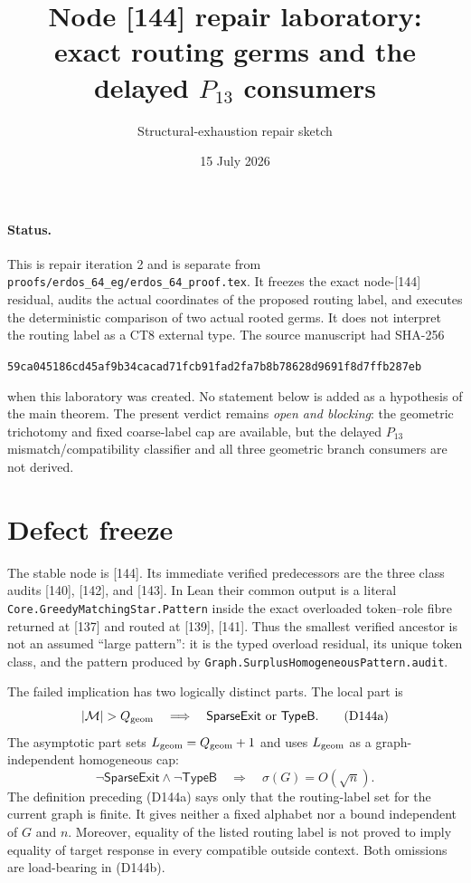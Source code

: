 \documentclass[11pt]{article}
\title{Node [144] repair laboratory:\\
exact routing germs and the delayed $P_{13}$ consumers}
\author{Structural-exhaustion repair sketch}
\date{15 July 2026}
\newcommand{\Exit}{\mathsf{SparseExit}}
\newcommand{\Fan}{\mathsf{TypeB}}
\begin{document}
\maketitle

\paragraph{Status.}
This is repair iteration 2 and is separate from
\texttt{proofs/erdos\_64\_eg/erdos\_64\_proof.tex}.  It freezes the exact
node-[144] residual, audits the actual coordinates of the proposed routing
label, and executes the deterministic comparison of two actual rooted germs.
It does not interpret the routing label as a CT8 external type.  The source
manuscript had SHA-256
\begin{center}
\texttt{59ca045186cd45af9b34cacad71fcb91fad2fa7b8b78628d9691f8d7ffb287eb}
\end{center}
when this laboratory was created.  No statement below is added as a
hypothesis of the main theorem.  The present verdict remains \emph{open and
blocking}: the geometric trichotomy and fixed coarse-label cap are available,
but the delayed $P_{13}$ mismatch/compatibility classifier and all three
geometric branch consumers are not derived.

\section{Defect freeze}

The stable node is [144].  Its immediate verified predecessors are the three
class audits [140], [142], and [143].  In Lean their common output is a
literal
\texttt{Core.GreedyMatchingStar.Pattern} inside the exact overloaded
token--role fibre returned at [137] and routed at [139], [141].  Thus the
smallest verified ancestor is not an assumed ``large pattern'': it is the
typed overload residual, its unique token class, and the pattern produced by
\texttt{Graph.SurplusHomogeneousPattern.audit}.

The failed implication has two logically distinct parts.  The local part is
\[
 |\mathcal M|>Q_{\rm geom}
 \quad\Longrightarrow\quad
 \Exit\ \text{or}\ \Fan .                                      \tag{D144a}
\]
The asymptotic part sets $L_{\rm geom}=Q_{\rm geom}+1$ and uses
$L_{\rm geom}$ as a graph-independent homogeneous cap:
\[
 \neg\Exit\wedge\neg\Fan
 \quad\Longrightarrow\quad
 \sigma(G)=O(\sqrt n).                                          \tag{D144b}
\]
The definition preceding (D144a) says only that the routing-label set for the
current graph is finite.  It gives neither a fixed alphabet nor a bound
independent of $G$ and $n$.  Moreover, equality of the listed routing label
is not proved to imply equality of target response in every compatible
outside context.  Both omissions are load-bearing in (D144b).
\end{document}
